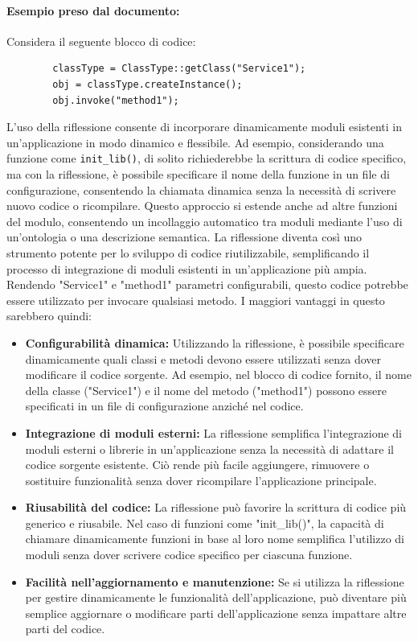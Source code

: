 \documentclass[11pt]{article}
\begin{document}
\begin{multicols*}{2}[\columnsep=1cm]
    \paragraph{Esempio preso dal documento:}
    Considera il seguente blocco di codice:
    \begin{lstlisting}
        classType = ClassType::getClass("Service1");
        obj = classType.createInstance();
        obj.invoke("method1");
    \end{lstlisting}

    L'uso della riflessione consente di incorporare dinamicamente moduli esistenti in un'applicazione in modo dinamico e flessibile. Ad esempio, considerando una funzione come \texttt{init\_lib()}, di solito richiederebbe la scrittura di codice specifico, ma con la riflessione, è possibile specificare il nome della funzione in un file di configurazione, consentendo la chiamata dinamica senza la necessità di scrivere nuovo codice o ricompilare. Questo approccio si estende anche ad altre funzioni del modulo, consentendo un incollaggio automatico tra moduli mediante l'uso di un'ontologia o una descrizione semantica. La riflessione diventa così uno strumento potente per lo sviluppo di codice riutilizzabile, semplificando il processo di integrazione di moduli esistenti in un'applicazione più ampia. Rendendo "Service1" e "method1" parametri configurabili, questo codice potrebbe essere utilizzato per invocare qualsiasi metodo.
    I maggiori vantaggi in questo sarebbero quindi:
    \begin{itemize}
        \item \textbf{Configurabilità dinamica:} Utilizzando la riflessione, è possibile specificare dinamicamente quali classi e metodi devono essere utilizzati senza dover modificare il codice sorgente. Ad esempio, nel blocco di codice fornito, il nome della classe ("Service1") e il nome del metodo ("method1") possono essere specificati in un file di configurazione anziché nel codice.
        \item \textbf{Integrazione di moduli esterni:} La riflessione semplifica l'integrazione di moduli esterni o librerie in un'applicazione senza la necessità di adattare il codice sorgente esistente. Ciò rende più facile aggiungere, rimuovere o sostituire funzionalità senza dover ricompilare l'applicazione principale.
        \item \textbf{Riusabilità del codice:} La riflessione può favorire la scrittura di codice più generico e riusabile. Nel caso di funzioni come "init\_lib()", la capacità di chiamare dinamicamente funzioni in base al loro nome semplifica l'utilizzo di moduli senza dover scrivere codice specifico per ciascuna funzione.
        \item \textbf{Facilità nell'aggiornamento e manutenzione:} Se si utilizza la riflessione per gestire dinamicamente le funzionalità dell'applicazione, può diventare più semplice aggiornare o modificare parti dell'applicazione senza impattare altre parti del codice.


\end{itemize}
\end{multicols*}
\end{document}
